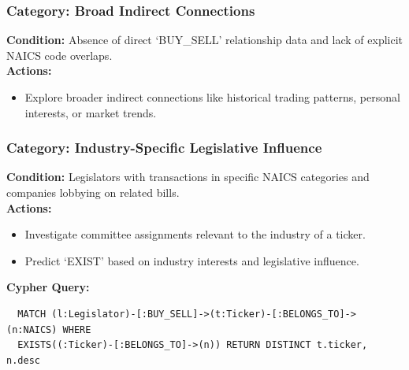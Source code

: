 \documentclass[15pt,letterpaper]{article}
\begin{document}
\begin{mdframed}
  \subsubsection*{Category: Broad Indirect Connections}
  \textbf{Condition:} Absence of direct `BUY\_SELL' relationship data and lack of explicit NAICS code overlaps.
  \\ \textbf{Actions:}
  \begin{itemize}
      \item Explore broader indirect connections like historical trading patterns, personal interests, or market trends.
  \end{itemize}
  
  \subsubsection*{Category: Industry-Specific Legislative Influence}
  \textbf{Condition:} Legislators with transactions in specific NAICS categories and companies lobbying on related bills.
  \\\textbf{Actions:}
  \begin{itemize}
      \item Investigate committee assignments relevant to the industry of a ticker.
      \item Predict `EXIST' based on industry interests and legislative influence.
  \end{itemize}
  \textbf{Cypher Query:} 
  \begin{verbatim}
  MATCH (l:Legislator)-[:BUY_SELL]->(t:Ticker)-[:BELONGS_TO]->(n:NAICS) WHERE
  EXISTS((:Ticker)-[:BELONGS_TO]->(n)) RETURN DISTINCT t.ticker, n.desc
  \end{verbatim}
  
  \end{mdframed}

  \vspace{5mm} %
\end{document}
